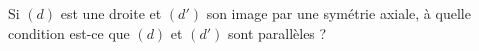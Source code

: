     
Si $(d)$ est une droite et $(d')$ son image par une symétrie axiale, à quelle condition est-ce que $(d)$ et $(d')$ sont parallèles ?
